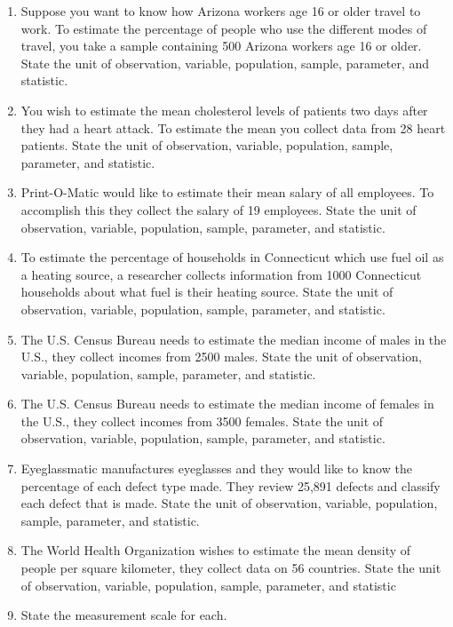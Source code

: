 \documentclass[
]{book}
\begin{document}
\begin{enumerate}
\def\labelenumi{\arabic{enumi}.}
\item
  Suppose you want to know how Arizona workers age 16 or older travel to work. To estimate the percentage of people who use the different modes of travel, you take a sample containing 500 Arizona workers age 16 or older. State the unit of observation, variable, population, sample, parameter, and statistic.
\item
  You wish to estimate the mean cholesterol levels of patients two days after they had a heart attack. To estimate the mean you collect data from 28 heart patients. State the unit of observation, variable, population, sample, parameter, and statistic.
\item
  Print-O-Matic would like to estimate their mean salary of all employees. To accomplish this they collect the salary of 19 employees. State the unit of observation, variable, population, sample, parameter, and statistic.
\item
  To estimate the percentage of households in Connecticut which use fuel oil as a heating source, a researcher collects information from 1000 Connecticut households about what fuel is their heating source. State the unit of observation, variable, population, sample, parameter, and statistic.
\item
  The U.S. Census Bureau needs to estimate the median income of males in the U.S., they collect incomes from 2500 males. State the unit of observation, variable, population, sample, parameter, and statistic.
\item
  The U.S. Census Bureau needs to estimate the median income of females in the U.S., they collect incomes from 3500 females. State the unit of observation, variable, population, sample, parameter, and statistic.
\item
  Eyeglassmatic manufactures eyeglasses and they would like to know the percentage of each defect type made. They review 25,891 defects and classify each defect that is made. State the unit of observation, variable, population, sample, parameter, and statistic.
\item
  The World Health Organization wishes to estimate the mean density of people per square kilometer, they collect data on 56 countries. State the unit of observation, variable, population, sample, parameter, and statistic
\item
  State the measurement scale for each.
\end{enumerate}
\end{document}
